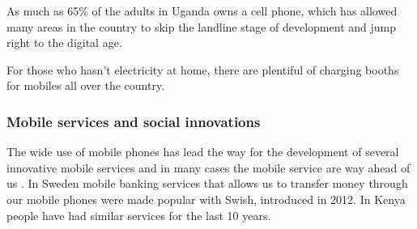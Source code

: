     As much as 65\% of the adults in Uganda owns a cell phone, which has allowed many areas in the country to skip the landline stage of development and jump right to the digital age.

    For those who hasn’t electricity at home, there are plentiful of charging booths for mobiles all over the country.

    \subsubsection{Mobile services and social innovations}
    The wide use of mobile phones has lead the way for the development of several innovative mobile services and in many cases the mobile service are way ahead of us  \cite{nissar}. In Sweden mobile banking services that allows us to transfer money through our mobile phones were made popular with Swish, introduced in 2012. In Kenya people have had similar services for the last 10 years.
